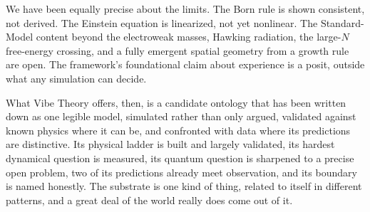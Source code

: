 We have been equally precise about the limits. The Born rule is shown consistent, not
derived. The Einstein equation is linearized, not yet nonlinear. The Standard-Model
content beyond the electroweak masses, Hawking radiation, the large-$N$ free-energy
crossing, and a fully emergent spatial geometry from a growth rule are open. The
framework's foundational claim about experience is a posit, outside what any simulation
can decide.

What Vibe Theory offers, then, is a candidate ontology that has been written down as one
legible model, simulated rather than only argued, validated against known physics where
it can be, and confronted with data where its predictions are distinctive. Its physical
ladder is built and largely validated, its hardest dynamical question is measured, its
quantum question is sharpened to a precise open problem, two of its predictions already
meet observation, and its boundary is named honestly. The substrate is one kind of
thing, related to itself in different patterns, and a great deal of the world really does
come out of it.
